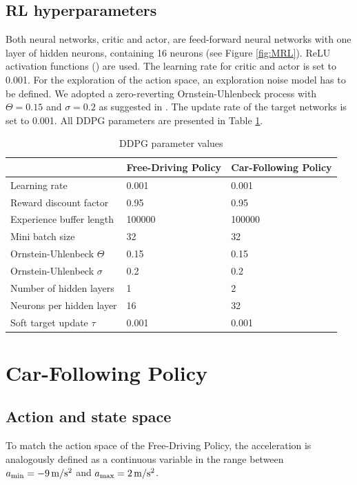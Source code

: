 \documentclass[review]{elsarticle}
\providecommand{\sub}[1]{_{\mathrm{#1}}}  %
\providecommand{\3}{{\ss}}
\begin{document}
\subsection{RL hyperparameters}
Both neural networks, critic and actor, are feed-forward neural
networks with one layer of hidden neurons, containing 16 neurons (see
Figure \ref{fig:MRL}). ReLU activation functions (\cite{relu}) are used. The learning rate for
critic and actor is set to 0.001. For the exploration of the action
space, an exploration noise model has to be defined. We adopted a
zero-reverting Ornstein-Uhlenbeck process with $\Theta = 0.15$  and $\sigma = 0.2$ as suggested in \cite{DDPG}. The update rate of the target networks is set to 0.001.
All DDPG parameters are presented in Table \ref{tab:DDPGparameters}.


  \begin{table}
	\caption{DDPG parameter values} 
	\label{tab:DDPGparameters} 
	\begin{center}
		\begin{tabular}{ p{} p{}  p{} }
			 & Free-Driving Policy & Car-Following Policy \\ \hline
			Learning rate & 0.001 & 0.001\\ 
			Reward discount factor & 0.95 & 0.95 \\ 
			Experience buffer length & 100000 & 100000 \\ 
			Mini batch size & 32 & 32 \\ 			
			Ornstein-Uhlenbeck  $\Theta$ & 0.15& 0.15 \\ 
			Ornstein-Uhlenbeck  $\sigma$ & 0.2 & 0.2 \\ 
			Number of hidden layers & 1 & 2\\
			Neurons per hidden layer & 16 & 32\\
			Soft target update  $\tau$ & 0.001 & 0.001\\
			
			
		\end{tabular}
	\end{center}
\end{table}


\section{Car-Following Policy}
\subsection{Action and state space}
\label{actionSpace1}
To match the action space of the Free-Driving Policy, the acceleration is analogously defined as a continuous variable in the range between $a\sub{\rm min} = \unit[-9]{m/s^2}$ and 
$a\sub{\rm max} =\unit[2]{m/s^2}$.
\end{document}
